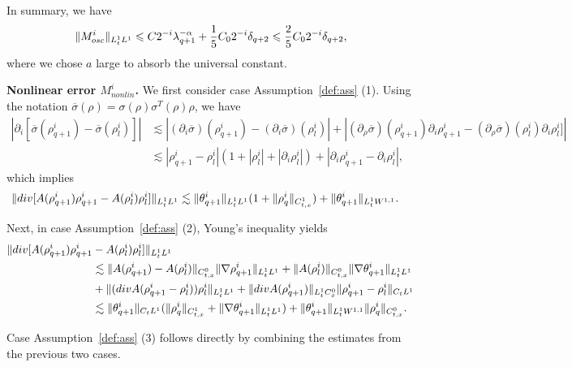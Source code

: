 \documentclass[10pt,a4paper]{amsart}
\numberwithin{equation}{section}
\def\leq{\leqslant}
\def\div{\mathord{{\rm div}}}
\def\leq{\leqslant}
\def\div{\mathord{{\rm div}}}
\begin{document}
In summary, we have
\begin{align}
    \|M^{i}_{osc}\|_{L^1_tL^1} \leq C2^{-i} \lambda_{q+1}^{-\alpha}+ \frac15C_02^{-i}\delta_{q+2}\leq \frac{2}{5}C_02^{-i}\delta_{q+2},\notag
\end{align}
where we chose $a$ large to absorb the universal constant.

\textbf{Nonlinear error $M_{nonlin}^i$.} 
     We first consider case Assumption~\ref{def:ass} \textnormal{(1)}. Using the notation $\overline\sigma(\rho)=\sigma(\rho)\sigma^T(\rho)\rho$, we have 
     \begin{align*}
       |\partial_i[ \overline \sigma(\rho_{q+1}^i)  -   \overline \sigma( \rho_l^i)   ]|&\lesssim  |(\partial_i \overline \sigma)(\rho_{q+1}^i)  -   (\partial_i \overline \sigma)(\rho_{l}^i)   |+|(\partial_\rho \overline \sigma)(\rho_{q+1}^i)\partial_i\rho_{q+1}^i  - (  \partial_\rho\overline \sigma)(\rho_{l}^i)\partial_i\rho_{l}^i  ]|\\
       &\lesssim   |\rho_{q+1}^i- \rho_l^i|(1+| \rho_{l}^i|+|\partial_i\rho_{l}^i|)+|\partial_i\rho_{q+1}^i-\partial_i \rho_l^i| ,
     \end{align*}
     which implies    \begin{align*}
        \|\div[A(\rho_{q+1}^i)\rho_{q+1}^i-A({\rho_l^i}){\rho_l^i}]\|_{L_t^1L^1}&\lesssim\| \theta_{q+1}^i \|_{L^1_tL^1}(1+\|\rho_q^i\|_{C_{t,x}^1})+ \|\theta_{q+1}^i\|_{L^1_tW^{1,1}}.
    \end{align*}
     
Next, in case Assumption~\ref{def:ass} \textnormal{(2)}, Young’s inequality yields
\begin{align*}
      \|\div[A(\rho_{q+1}^i)\rho_{q+1}^i&-A({\rho_l^i}){\rho_l^i}]\|_{L_t^1L^1}\\
      &\lesssim \|A(\rho_{q+1}^i)-A(\rho_l^i)\|_{C_{t,x}^0}\|\nabla\rho_{q+1}^i\|_{L^1_tL^1}+\| A(\rho_l^i)\|_{C_{t,x}^0}\|\nabla\theta_{q+1}^i\|_{L^1_tL^1}\\
     &+\|(\div A(\rho_{q+1}^i - \rho_l^i))\rho_{l}^i\|_{L^1_tL^1} +\|\div A( \rho_{q+1}^i)\|_{L_{t}^1C_{x}^0}\|\rho_{q+1}^i-\rho_l^i\|_{C_tL^1}\\
     &\lesssim \| \theta_{q+1}^i \|_{C_tL^1}(\|\rho_{q}^i\|_{C_{t,x}^1}+\|\nabla\theta_{q+1}^i\|_{L^1_tL^1})+ \|\theta_{q+1}^i \|_{L^1_tW^{1,1}}\|\rho_{q}^i\|_{C_{t,x}^0}.
\end{align*}

Case Assumption~\ref{def:ass} \textnormal{(3)} follows directly by combining the estimates from the previous two cases.
\end{document}
